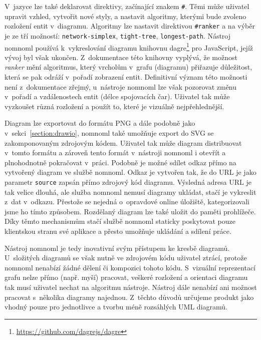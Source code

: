 V~jazyce lze také deklarovat direktivy, začínající znakem \texttt{\#}.
Těmi může uživatel upravit vzhled, vytvořit nové styly, a nastavit algoritmy, kterými bude zvoleno rozložení entit v~diagramu.
Algoritmy lze nastavit direktivou \texttt{\#ranker} a na výběr je ze tří možností: \texttt{network-simplex}, \texttt{tight-tree}, \texttt{longest-path}.
Nástroj nomnoml používá k~vykreslování diagramu knihovnu dagre\footnote{\url{https://github.com/dagrejs/dagre}} pro JavaScript, jejíž vývoj byl však ukončen.
Z~dokumentace této knihovny vyplývá, že možnost \emph{ranker} mění algoritmus, který vrcholům v~grafu (diagramu) přiřazuje důležitost, která se pak odráží v~pořadí zobrazení entit.
Definitivní význam této možnosti není z~dokumentace zřejmý, u~nástroje nomnoml lze však pozorovat změnu v~pořadí a vzdálenostech entit (délce spojovacích čar).
Uživatel tak může vyzkoušet různá rozložení a použít to, které je vizuálně nejpřehlednější.

Diagram lze exportovat do formátu PNG a dále podobně jako v~sekci~\ref{section:drawio}, nomnoml také umožňuje export do SVG se zakomponovaným zdrojovým kódem.
Uživatel tak může diagram distribuovat v~tomto formátu a zároveň tento formát v~nástroji nomnoml i otevřít a plnohodnotně pokračovat v~práci.
Podobně je možné sdílet odkaz přímo na vytvořený diagram ve službě nomnoml.
Odkaz je vytvořen tak, že do URL je jako parametr \texttt{source} zapsán přímo zdrojový kód diagramu.
Výsledná adresa URL je tak velice dlouhá, ale služba nomnoml nemusí diagramy ukládat, stačí je vykreslit z~dat v~odkazu.
Přestože se nejedná o~opravdové online úložiště, kategorizovali jsme ho tímto způsobem.
Rozdělaný diagram lze také uložit do paměti prohlížeče.
Díky těmto mechanismům stačí službě nomnoml staticky poskytovat pouze klientskou stranu své aplikace a přesto umožňuje ukládání a sdílení práce.

Nástroj nomnoml je tedy inovativní svým přístupem ke kresbě diagramů.
U~složitých diagramů se však nutně ve zdrojovém kódu uživatel ztrácí, protože nomnoml nenabízí žádné dělení či kompozici tohoto kódu.
S~vizuální reprezentací grafu nelze přímo (např. myší) pracovat, veškeré rozložení a orientaci diagramu tak musí uživatel nechat na algoritmu nástroje.
Nástroj dále nenabízí ani možnost pracovat s~několika diagramy najednou.
Z~těchto důvodů určujeme produkt jako vhodný pouze pro jednotlivce a tvorbu méně rozsáhlých UML diagramů.

